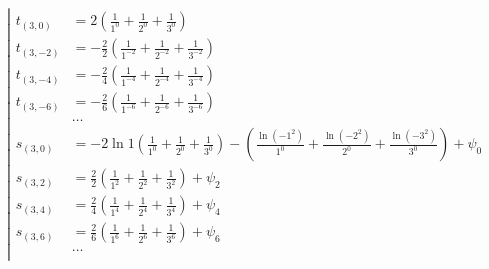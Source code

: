 \begin{equation*} \left| \begin{aligned}
t_{(3,0)} &=
  2
  \left(
  \frac{1}{1^0}
+ \frac{1}{2^0}
+ \frac{1}{3^0}
  \right) \\
%
t_{(3,-2)} &=
- \frac{2}{2}
  \left(
  \frac{1}{1^{-2}}
+ \frac{1}{2^{-2}}
+ \frac{1}{3^{-2}}
  \right) \\
%
t_{(3,-4)} &=
- \frac{2}{4}
  \left(
  \frac{1}{1^{-4}}
+ \frac{1}{2^{-4}}
+ \frac{1}{3^{-4}}
  \right) \\
%
t_{(3,-6)} &=
- \frac{2}{6}
  \left(
  \frac{1}{1^{-6}}
+ \frac{1}{2^{-6}}
+ \frac{1}{3^{-6}}
  \right) \\
%
&\ldots \\
%
s_{(3,0)} &=
- 2 \ln{1}
  \left(
  \frac{1}{1^0}
+ \frac{1}{2^0}
+ \frac{1}{3^0}
  \right)
- \left(
  \frac{\ln{(- 1^2)}}{1^0}
+ \frac{\ln{(- 2^2)}}{2^0}
+ \frac{\ln{(- 3^2)}}{3^0}
  \right)
+ \psi_0 \\
%
s_{(3,2)} &=
  \frac{2}{2}
  \left(
  \frac{1}{1^2}
+ \frac{1}{2^2}
+ \frac{1}{3^2}
  \right)
+ \psi_2 \\
%
s_{(3,4)} &=
  \frac{2}{4}
  \left(
  \frac{1}{1^4}
+ \frac{1}{2^4}
+ \frac{1}{3^4}
  \right)
+ \psi_4 \\
%
s_{(3,6)} &=
  \frac{2}{6}
  \left(
  \frac{1}{1^6}
+ \frac{1}{2^6}
+ \frac{1}{3^6}
  \right)
+ \psi_6 \\
%
&\ldots \\
\end{aligned} \right. \end{equation*}